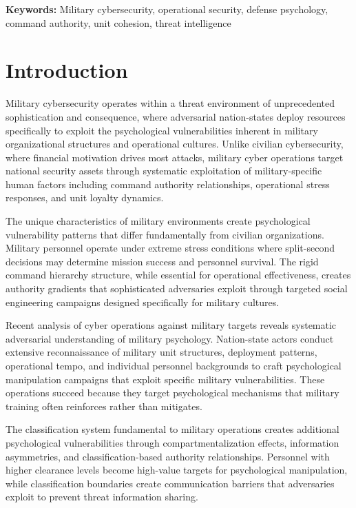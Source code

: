 \documentclass[10pt, twocolumn]{article}
\begin{document}
\textbf{Keywords:} Military cybersecurity, operational security, defense psychology, command authority, unit cohesion, threat intelligence

\section{Introduction}

Military cybersecurity operates within a threat environment of unprecedented sophistication and consequence, where adversarial nation-states deploy resources specifically to exploit the psychological vulnerabilities inherent in military organizational structures and operational cultures. Unlike civilian cybersecurity, where financial motivation drives most attacks, military cyber operations target national security assets through systematic exploitation of military-specific human factors including command authority relationships, operational stress responses, and unit loyalty dynamics.

The unique characteristics of military environments create psychological vulnerability patterns that differ fundamentally from civilian organizations. Military personnel operate under extreme stress conditions where split-second decisions may determine mission success and personnel survival. The rigid command hierarchy structure, while essential for operational effectiveness, creates authority gradients that sophisticated adversaries exploit through targeted social engineering campaigns designed specifically for military cultures.

Recent analysis of cyber operations against military targets reveals systematic adversarial understanding of military psychology. Nation-state actors conduct extensive reconnaissance of military unit structures, deployment patterns, operational tempo, and individual personnel backgrounds to craft psychological manipulation campaigns that exploit specific military vulnerabilities. These operations succeed because they target psychological mechanisms that military training often reinforces rather than mitigates.

The classification system fundamental to military operations creates additional psychological vulnerabilities through compartmentalization effects, information asymmetries, and classification-based authority relationships. Personnel with higher clearance levels become high-value targets for psychological manipulation, while classification boundaries create communication barriers that adversaries exploit to prevent threat information sharing.
\end{document}
